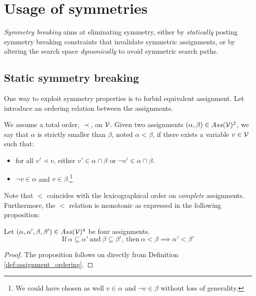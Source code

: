 \section{Usage of symmetries}

\emph{Symmetry breaking} aims at eliminating symmetry, either
by \emph{statically} posting symmetry breaking constraints that invalidate symmetric
assignments, or by altering the search space \emph{dynamically} to avoid symmetric search paths.


\subsection{Static symmetry breaking}

One way to exploit symmetry properties is to forbid equivalent assignment.
Let introduce an ordering relation between the assignments.

\begin{definition}
	\label{def:assignment_ordering}
	We assume a total order, $\prec$, on $\mathcal{V}$.  Given two assignments $(\alpha,\beta) \in Ass(\mathcal{V})^2 $, 
	we say that $\alpha$ is strictly smaller than $\beta$, noted $\alpha < \beta$, if there exists a variable $v \in \mathcal{V}$
	such that:
	\begin{itemize}
		\item for all $v' \prec v$, either $v' \in \alpha \cap \beta$ or $\neg v' \in \alpha \cap
		\beta$.
		\item $\neg v \in \alpha$ and $v \in \beta$.\footnote{We could have chosen as well $v \in \alpha$ and $\neg v \in \beta$ without loss of generality.}
	\end{itemize}
\end{definition}

Note that $<$ coincides with the lexicographical order on \emph{complete}
assignments. Furthermore, the $<$ relation is monotonic as expressed in the following proposition:

\begin{proposition}
	\label{prop:monocity_assignments_ordering}
	Let  $(\alpha,\alpha',\beta,\beta') \in Ass(\mathcal{V})^4 $ be four assignments.
	$$\text{If}~\alpha \subseteq \alpha'~\text{and}~\beta \subseteq \beta',~\text{then}~\alpha < \beta \implies \alpha' < \beta'$$
\end{proposition}

\begin{proof}
	The proposition follows on directly from Definition \ref{def:assignment_ordering}.
\end{proof}


